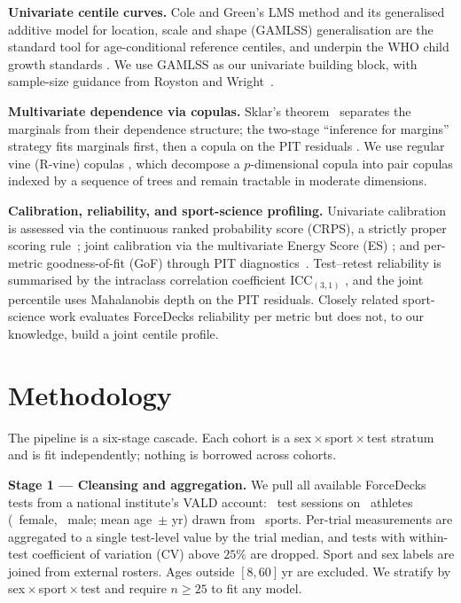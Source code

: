 \documentclass[10pt]{article}
\begin{document}
\textbf{Univariate centile curves.} Cole and Green's LMS method
\cite{cole1992lms} and its generalised additive model for location,
scale and shape (GAMLSS) generalisation
\cite{rigby2005gamlss, stasinopoulos2007gamlss} are the standard tool
for age-conditional reference centiles, and underpin the WHO child
growth standards \cite{borghi2006who}. We use GAMLSS as our univariate
building block, with sample-size guidance from Royston and
Wright~\cite{royston1998construct}.

\textbf{Multivariate dependence via copulas.} Sklar's
theorem~\cite{sklar1959fonctions} separates the marginals from their
dependence structure; the two-stage ``inference for margins'' strategy
fits marginals first, then a copula on the PIT residuals
\cite{joe2014dependence}. We use regular vine (R-vine) copulas
\cite{aas2009pair, dissmann2013selecting, czado2022vinereview}, which
decompose a $p$-dimensional copula into pair copulas indexed by a
sequence of trees and remain tractable in moderate dimensions.

\textbf{Calibration, reliability, and sport-science profiling.}
Univariate calibration is assessed via the continuous ranked
probability score (CRPS), a strictly proper scoring
rule~\cite{gneiting2007proper}; joint calibration via the multivariate
Energy Score (ES) \cite{gneiting2008assessing, gneiting2014probabilistic};
and per-metric goodness-of-fit (GoF) through PIT
diagnostics~\cite{dawid1984pit}. Test--retest reliability is summarised
by the intraclass correlation coefficient ICC$_{(3,1)}$
\cite{koo2016icc, weir2005icc}, and the joint percentile uses
Mahalanobis depth \cite{mahalanobis1936generalized, liu1999depth} on
the PIT residuals. Closely related sport-science work evaluates
ForceDecks reliability per metric
\cite{cormack2008reliability, merrigan2022forcedecks} but does not, to
our knowledge, build a joint centile profile.

\section{Methodology}
\label{sec:methods}

The pipeline is a six-stage cascade. Each cohort is a
sex\,$\times$\,sport\,$\times$\,test stratum and is fit independently;
nothing is borrowed across cohorts.

\textbf{Stage 1 --- Cleansing and aggregation.}
We pull all available ForceDecks tests from a national institute's
VALD account: \Ntests{}~test sessions on \Nathletes{}~athletes
(\Nfemale{}~female, \Nmale{}~male; mean age
\MeanAge{}\,$\pm$\,\SdAge{}\,yr) drawn from \Nsports{}~sports.
Per-trial measurements are aggregated to a single test-level value by
the trial median, and tests with within-test coefficient of variation
(CV) above $25\%$ are dropped. Sport and sex labels are joined from
external rosters. Ages outside $[8,60]$\,yr are excluded. We stratify
by sex\,$\times$\,sport\,$\times$\,test and require $n\!\geq\!25$ to
fit any model.
\end{document}
